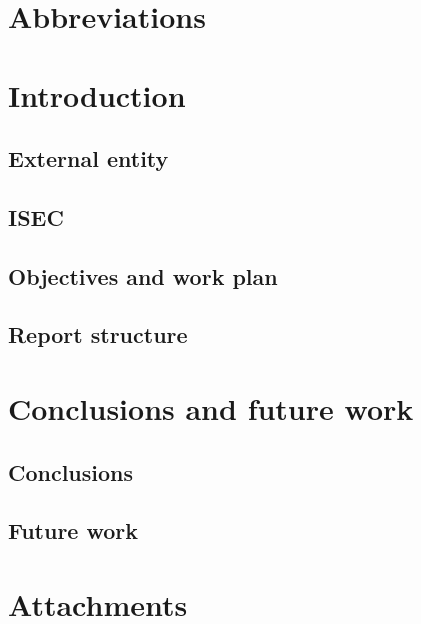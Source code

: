 \documentclass{article}
\begin{document}
\section{Abbreviations}


\section{Introduction}

\subsection{External entity}

\subsection{ISEC}

\subsection{Objectives and work plan}

\subsection{Report structure}

\section{Conclusions and future work}

\subsection{Conclusions}

\subsection{Future work}

\printbibliography

\section{Attachments}
\end{document}

